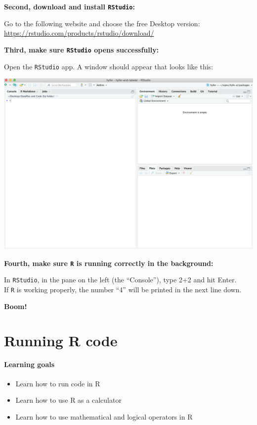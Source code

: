 \documentclass[
]{book}
\providecommand{\tightlist}{%
  \setlength{\itemsep}{0pt}\setlength{\parskip}{0pt}}
\begin{document}
\textbf{Second, download and install \texttt{RStudio}:}

Go to the following website and choose the free Desktop version:
\url{https://rstudio.com/products/rstudio/download/}

\textbf{Third, make sure \texttt{RStudio} opens successfully:}

Open the \texttt{RStudio} app. A window should appear that looks like this:

\includegraphics{img/rstudio_firstopen.png}

\textbf{Fourth, make sure \texttt{R} is running correctly in the background:}

In \texttt{RStudio}, in the pane on the left (the ``Console''), type 2+2 and hit Enter.\\
If \texttt{R} is working properly, the number ``4'' will be printed in the next line down.

\textbf{Boom!}

\hypertarget{running-r-code}{%
\chapter{Running R code}\label{running-r-code}}

\hypertarget{learning-goals}{%
\subsubsection*{Learning goals}\label{learning-goals}}

\begin{itemize}
\tightlist
\item
  Learn how to run code in R
\item
  Learn how to use R as a calculator
\item
  Learn how to use mathematical and logical operators in R
\end{itemize}
\end{document}
